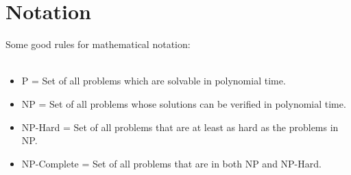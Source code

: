 \documentclass[14pt]{article}
\begin{document}
\vspace*{.5 cm}
\section*{Notation}
Some good rules for mathematical notation:
\\
\\
\begin{itemize}
\item P = Set of all problems which are solvable in polynomial time.
\item NP = Set of all problems whose solutions can be verified in polynomial time.
\item NP-Hard = Set of all problems that are at least as hard as the problems in NP.
\item NP-Complete = Set of all problems that are in both NP and NP-Hard.
\end{itemize}
\end{document}
